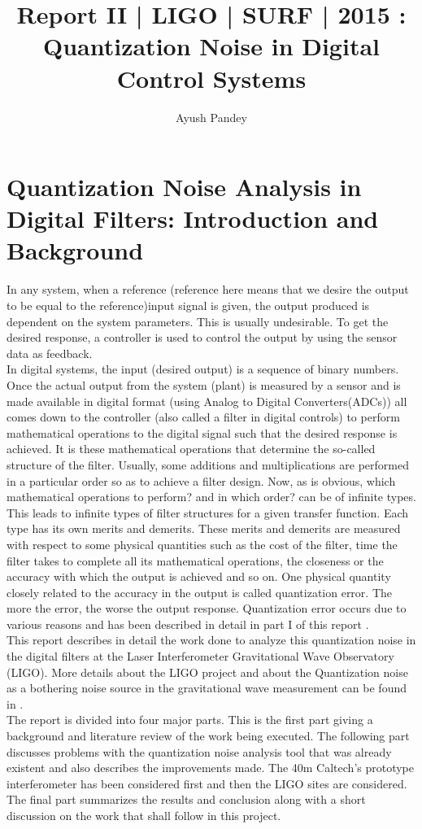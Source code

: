 \documentclass[colorlinks=true,pdfstartview=FitV,linkcolor=blue,
            citecolor=red,urlcolor=magenta]{ligodoc}
\title{Report II | LIGO | SURF | 2015 : Quantization Noise in Digital Control Systems}
\author{Ayush Pandey}
\begin{document}
\section{Quantization Noise Analysis in Digital Filters: Introduction and Background}
In any system, when a reference (reference here means that we desire the output to be equal to the reference)input signal is given, the output produced is dependent on the system parameters. This is usually undesirable. To get the desired response, a controller is used to control the output by using the sensor data as feedback.\\ In digital systems, the input (desired output) is a sequence of binary numbers. Once the actual output from the system (plant) is measured by a sensor and is made available in digital format (using Analog to Digital Converters(ADCs)) all comes down to the controller (also called a filter in digital controls) to perform mathematical operations to the digital signal such that the desired response is achieved. It is these mathematical operations that determine the so-called structure of the filter. Usually, some additions and multiplications are performed in a particular order so as to achieve a filter design. Now, as is obvious, which mathematical operations to perform? and in which order? can be of infinite types. This leads to infinite types of filter structures for a given transfer function. Each type has its own merits and demerits. These merits and demerits are measured with respect to some physical quantities such as the cost of the filter, time the filter takes to complete all its mathematical operations, the closeness or the accuracy with which the output is achieved and so on. One physical quantity closely related to the accuracy in the output is called quantization error. The more the error, the worse the output response. Quantization error occurs due to various reasons and has been described in detail in part I of this report \cite{reportI}.\\
This report describes in detail the work done to analyze this quantization noise in the digital filters at the Laser Interferometer Gravitational Wave Observatory (LIGO). More details about the LIGO project and about the Quantization noise as a bothering noise source in the gravitational wave measurement can be found in \cite{reportI}. \\
The report is divided into four major parts. This is the first part giving a background and literature review of the work being executed. The following part discusses problems with the quantization noise analysis tool that was already existent and also describes the improvements made. The 40m Caltech's prototype interferometer has been considered first and then the LIGO sites are considered. The final part summarizes the results and conclusion along with a short discussion on the work that shall follow in this project.
\end{document}
